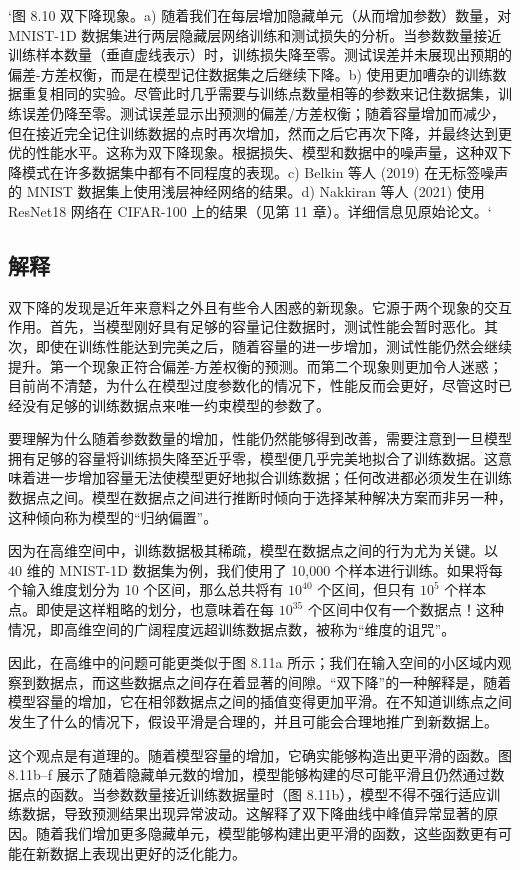 `图 8.10 双下降现象。a) 随着我们在每层增加隐藏单元（从而增加参数）数量，对 MNIST-1D 数据集进行两层隐藏层网络训练和测试损失的分析。当参数数量接近训练样本数量（垂直虚线表示）时，训练损失降至零。测试误差并未展现出预期的偏差-方差权衡，而是在模型记住数据集之后继续下降。b) 使用更加嘈杂的训练数据重复相同的实验。尽管此时几乎需要与训练点数量相等的参数来记住数据集，训练误差仍降至零。测试误差显示出预测的偏差/方差权衡；随着容量增加而减少，但在接近完全记住训练数据的点时再次增加，然而之后它再次下降，并最终达到更优的性能水平。这称为双下降现象。根据损失、模型和数据中的噪声量，这种双下降模式在许多数据集中都有不同程度的表现。c) Belkin 等人 (2019) 在无标签噪声的 MNIST 数据集上使用浅层神经网络的结果。d) Nakkiran 等人 (2021) 使用 ResNet18 网络在 CIFAR-100 上的结果（见第 11 章）。详细信息见原始论文。`
\subsection{解释}
双下降的发现是近年来意料之外且有些令人困惑的新现象。它源于两个现象的交互作用。首先，当模型刚好具有足够的容量记住数据时，测试性能会暂时恶化。其次，即使在训练性能达到完美之后，随着容量的进一步增加，测试性能仍然会继续提升。第一个现象正符合偏差-方差权衡的预测。而第二个现象则更加令人迷惑；目前尚不清楚，为什么在模型过度参数化的情况下，性能反而会更好，尽管这时已经没有足够的训练数据点来唯一约束模型的参数了。

要理解为什么随着参数数量的增加，性能仍然能够得到改善，需要注意到一旦模型拥有足够的容量将训练损失降至近乎零，模型便几乎完美地拟合了训练数据。这意味着进一步增加容量无法使模型更好地拟合训练数据；任何改进都必须发生在训练数据点之间。模型在数据点之间进行推断时倾向于选择某种解决方案而非另一种，这种倾向称为模型的“归纳偏置”。

因为在高维空间中，训练数据极其稀疏，模型在数据点之间的行为尤为关键。以 40 维的 MNIST-1D 数据集为例，我们使用了 10,000 个样本进行训练。如果将每个输入维度划分为 10 个区间，那么总共将有 $10^40$ 个区间，但只有 $10^5$ 个样本点。即使是这样粗略的划分，也意味着在每 $10^35$ 个区间中仅有一个数据点！这种情况，即高维空间的广阔程度远超训练数据点数，被称为“维度的诅咒”。

因此，在高维中的问题可能更类似于图 8.11a 所示；我们在输入空间的小区域内观察到数据点，而这些数据点之间存在着显著的间隙。“双下降”的一种解释是，随着模型容量的增加，它在相邻数据点之间的插值变得更加平滑。在不知道训练点之间发生了什么的情况下，假设平滑是合理的，并且可能会合理地推广到新数据上。

这个观点是有道理的。随着模型容量的增加，它确实能够构造出更平滑的函数。图 8.11b–f 展示了随着隐藏单元数的增加，模型能够构建的尽可能平滑且仍然通过数据点的函数。当参数数量接近训练数据量时（图 8.11b），模型不得不强行适应训练数据，导致预测结果出现异常波动。这解释了双下降曲线中峰值异常显著的原因。随着我们增加更多隐藏单元，模型能够构建出更平滑的函数，这些函数更有可能在新数据上表现出更好的泛化能力。

